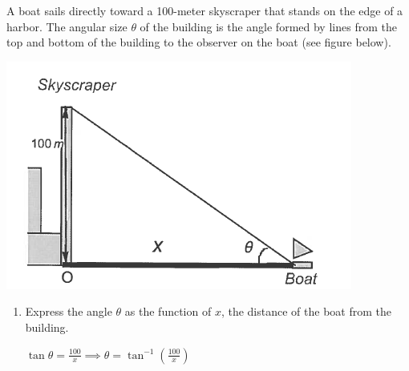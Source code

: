 \documentclass[nooutcomes,handout]{ximera}
\begin{document}
\begin{problem}
A boat sails directly toward a 100-meter skyscraper that stands on the edge of a harbor.  The angular size $\theta$ of the building is the angle formed by lines from the top and bottom of the building to the observer on the boat (see figure below).
    \begin{image}
      \includegraphics[scale = 0.6]{figure6.png}
    \end{image}

\begin{enumerate}
	\item Express the angle $\theta$ as the function of $x$, the distance of the boat from the building.
	\begin{freeResponse}
	$\tan\theta=\frac{100}{x} \implies \theta=\tan^{-1}\left( \frac{100}{x} \right)$
	
	\end{freeResponse}
	

\end{enumerate}
\end{problem}
\end{document}
